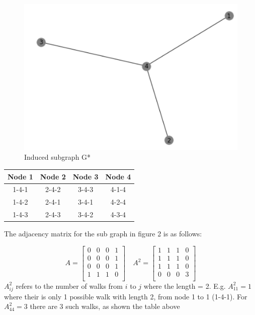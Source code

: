 \documentclass[a4paper,12pt]{article}
\begin{document}
\begin{figure}[h]
	\begin{center}
    \includegraphics[scale=0.5]{induced.PNG}
    \caption{Induced subgraph G*}
	\end{center}
\end{figure}

\begin{table}[h]
\centering
\begin{tabular}{c|c|c|c}
Node 1 & Node 2 & Node 3 & Node 4\\
\hline
1-4-1 & 2-4-2 & 3-4-3 & 4-1-4\\
1-4-2 & 2-4-1 & 3-4-1 & 4-2-4\\
1-4-3 & 2-4-3 & 3-4-2 & 4-3-4\\
\end{tabular}
\end{table}

The adjacency matrix for the sub graph in figure 2 is as follows:

	$$
	A = \begin{bmatrix} 
		0&0&0&1\\
		0&0&0&1\\
		0&0&0&1\\
		1&1&1&0\\
	\end{bmatrix} \quad
	A^2 = \begin{bmatrix} 
		1&1&1&0\\
		1&1&1&0\\
		1&1&1&0\\
		0&0&0&3\\
	\end{bmatrix}
	$$
$A^2_{ij}$ refers to the number of walks from $i$ to $j$ where the length = 2. E.g. $A^2_{11} = 1$ where their is only 1 possible walk with length 2, from node 1 to 1 (1-4-1). For $A^2_{44} = 3$ there are 3 such walks, as shown the table above
\end{document}
